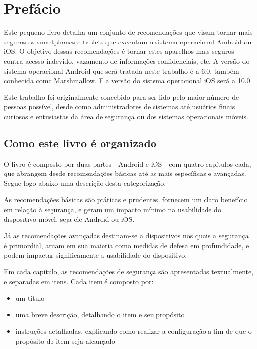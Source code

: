 \chapter*{Pref\'acio}

Este pequeno livro detalha um conjunto de recomenda\c c\~oes que visam tornar mais seguros os smartphones e tablets que executam o sistema operacional Android ou iOS. O objetivo dessas recomenda\c c\~oes \'e tornar estes aparelhos mais seguros contra acesso indevido, vazamento de informa\c c\~oes confidenciais, etc. A vers\~ao do sistema operacional Android que ser\'a tratada neste trabalho \'e a 6.0, tamb\'em conhecida como Marshmallow. E a vers\~ao do sistema operacional iOS ser\'a a 10.0

Este trabalho foi originalmente concebido para ser lido pelo maior n\'umero de pessoas poss\'ivel, desde como administradores de sistemas at\'e usu\'arios finais curiosos e entusiastas da \'area de seguran\c ca ou dos sistemas operacionais m\'oveis.

\section*{Como este livro \'e organizado}

O livro \'e composto por duas partes - Android e iOS - com quatro cap\'itulos cada, que abrangem desde recomenda\c c\~oes b\'asicas at\'e as mais espec\'ificas e avan\c cadas. Segue logo abaixo uma descri\c c\~ao desta categoriza\c c\~ao. 

As recomenda\c c\~oes b\'asicas s\~ao pr\'aticas e prudentes, fornecem um claro benef\'icio em rela\c c\~ao \`a seguran\c ca, e geram um impacto m\'inimo na usabilidade do dispositivo m\'ovel, seja ele Android ou iOS. 

J\'a as recomenda\c c\~oes avan\c cadas destinam-se a dispositivos nos quais a seguran\c ca \'e primordial, atuam em sua maioria como medidas de defesa em profundidade, e podem impactar significamente a usabilidade do dispositivo.

Em cada cap\'itulo, as recomenda\c c\~oes de seguran\c ca s\~ao apresentadas textualmente, e separadas em itens. Cada item \'e composto por:

\begin{itemize}
\item um t\'itulo
\item uma breve descri\c c\~ao, detalhando o item e seu prop\'osito
\item instru\c c\~oes detalhadas, explicando como realizar a configura\c c\~ao a fim de que o prop\'osito do item seja alcan\c cado
\end{itemize}

